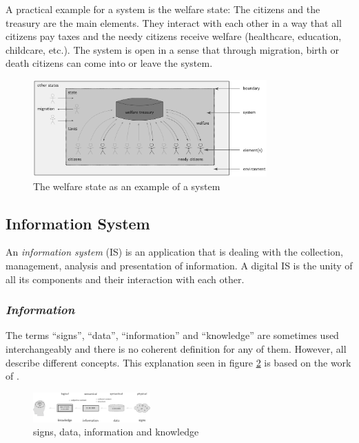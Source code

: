 A practical example for a system is the welfare state: The citizens and the treasury are the main elements. They interact with each other in a way that all citizens pay taxes and the needy citizens receive welfare (healthcare, education, childcare, etc.). The system is open in a sense that through migration, birth or death citizens can come into or leave the system.

\begin{figure}[ht]
  \centering
  \includegraphics[width = 0.8\textwidth]{graphics/basics/social_system}
  \caption{The welfare state as an example of a system}
  \label{fig:social_system}
\end{figure}




\subsection{Information System} %
\label{sub:information_system}

An \emph{information system} (IS) is an application that is dealing with the collection, management, analysis and presentation of information. A digital IS is the unity of all its components and their interaction with each other.

\subsubsection{\emph{Information}} %
\label{ssub:definition_of_information}
The terms ``signs'', ``data'', ``information'' and ``knowledge'' are sometimes used interchangeably and there is no coherent definition for any of them. However, all describe different concepts. This explanation seen in figure \ref{fig:information} is based on the work of \cite{datinfwis}.

\begin{figure}[ht]
    \begin{center}
        \includegraphics[width=0.4\textwidth]{graphics/basics/information}
    \end{center}
    \caption{signs, data, information and knowledge}
    \label{fig:information}
\end{figure}

